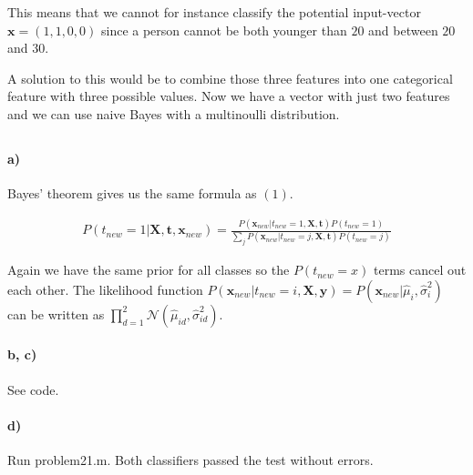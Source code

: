 \documentclass{article}
\begin{document}
This means that we cannot for instance classify the potential input-vector
$\mathbf{x} = (1, 1, 0, 0)$ since a person cannot be both younger than $20$ and
between $20$ and $30$.

A solution to this would be to combine those three features into one
categorical feature with three possible values. Now we have a vector with just
two features and we can use naive Bayes with a multinoulli distribution.

\setcounter{section}{2}
\setcounter{subsection}{0}
\subsection{}

\paragraph{a)}

Bayes' theorem gives us the same formula as $(1)$.

\begin{align}
  P\left( t_{new} = 1 \vert \mathbf{X}, \mathbf{t}, \mathbf{x}_{new} \right)
  = \frac{P \left( \mathbf{x}_{new} \vert t_{new} = 1, \mathbf{X}, \mathbf{t} \right) P \left( t_{new} = 1 \right)}{ \sum_j P \left( \mathbf{x}_{new} \vert t_{new} = j, \mathbf{X}, \mathbf{t} \right) P \left( t_{new} = j \right) }
\end{align}

Again we have the same prior for all classes so the $P(t_{new} = x)$ terms cancel out each other. The likelihood function $P(\mathbf{x}_{new}
\vert t_{new} = i, \mathbf{X}, \mathbf{y}) = P(\mathbf{x}_{new} \vert
\hat{\mu}_i, \hat{\sigma}_i^2)$ can be written as $\prod_{d = 1}^{2}
\mathcal{N}(\hat{\mu}_{id}, \hat{\sigma}^2_{id})$.

\paragraph{b, c)}

See code.

\paragraph{d)}

Run problem21.m. Both classifiers passed the test without errors.

\subsection{}
\end{document}
